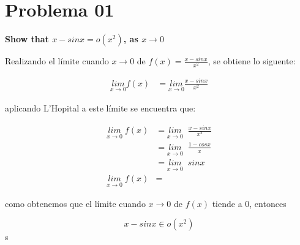 \section*{Problema 01}

\textbf{Show that $x-sinx = o(x^2)$, as $x\rightarrow 0$}

Realizando el límite cuando $x\rightarrow 0$ de $f(x)=\frac{x-sinx}{x^2}$, se obtiene lo siguente:

\begin{align*}
    \underset{x\rightarrow 0}{lim} f(x) & = \underset{x\rightarrow 0}{lim} \frac{x-sinx}{x^2}
\end{align*}

aplicando L'Hopital a este límite se encuentra que:

\begin{align*}
    \underset{x\rightarrow 0}{lim} \;f(x) & = \underset{x\rightarrow 0}{lim} \;\;\frac{x-sinx}{x^2} \\
                                          & = \underset{x\rightarrow 0}{lim} \;\;\frac{1-cosx}{x}   \\
                                          & = \underset{x\rightarrow 0}{lim} \;\;sinx               \\
    \underset{x\rightarrow 0}{lim} \;f(x) & =
\end{align*}


como obtenemos que el límite cuando $x\rightarrow 0$ de $f(x)$ tiende a 0, entonces

\begin{equation*}
    x-sinx \in o(x^2)
\end{equation*}s